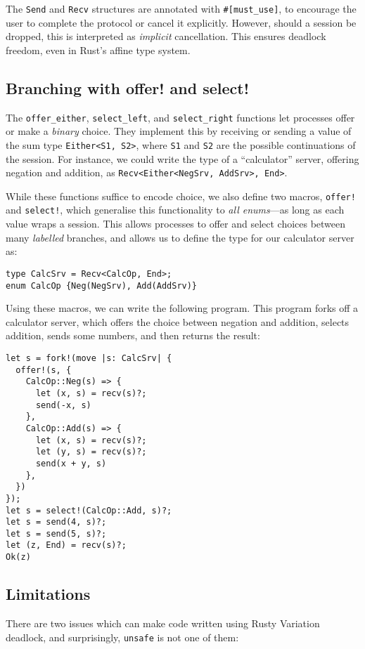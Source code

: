 \documentclass[sigconf,UKEnglish,natbib=false]{acmart}
\begin{document}
The \lstinline{Send} and \lstinline{Recv} structures are annotated with \lstinline{#[must_use]}, to encourage the user to complete the protocol or cancel it explicitly. However, should a session be dropped, this is interpreted as \emph{implicit} cancellation. This ensures deadlock freedom, even in Rust's affine type system.

\subsection*{Branching with offer! and select!}
The \lstinline{offer_either}, \lstinline{select_left}, and \lstinline{select_right} functions let processes offer or make a \emph{binary} choice. They implement this by receiving or sending a value of the sum type \lstinline{Either<S1, S2>}, where \lstinline{S1} and \lstinline{S2} are the possible continuations of the session. For instance, we could write the type of a ``calculator'' server, offering negation and addition, as \lstinline{Recv<Either<NegSrv, AddSrv>, End>}.

While these functions suffice to encode choice, we also define two macros, \lstinline{offer!} and \lstinline{select!}, which generalise this functionality to \emph{all enums}---as long as each value wraps a session. This allows processes to offer and select choices between many \emph{labelled} branches, and allows us to define the type for our calculator server as:
\begin{lstlisting}
type CalcSrv = Recv<CalcOp, End>;
enum CalcOp {Neg(NegSrv), Add(AddSrv)}
\end{lstlisting}
Using these macros, we can write the following program. This program forks off a calculator server, which offers the choice between negation and addition, selects addition, sends some numbers, and then returns the result:
\begin{lstlisting}
let s = fork!(move |s: CalcSrv| {
  offer!(s, {
    CalcOp::Neg(s) => {
      let (x, s) = recv(s)?;
      send(-x, s)
    },
    CalcOp::Add(s) => {
      let (x, s) = recv(s)?;
      let (y, s) = recv(s)?;
      send(x + y, s)
    },
  })
});
let s = select!(CalcOp::Add, s)?;
let s = send(4, s)?;
let s = send(5, s)?;
let (z, End) = recv(s)?;
Ok(z)
\end{lstlisting}

\subsection*{Limitations}
There are two issues which can make code written using Rusty Variation deadlock, and surprisingly, \lstinline{unsafe} is not one of them:
\end{document}
